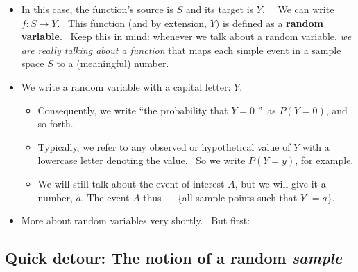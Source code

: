 \documentclass[11pt]{article}
\begin{document}
\begin{itemize}
\begin{itemize}
\item In this case, the function's source is $S$ and its target is $Y$. \ \
We can write $f:S\rightarrow Y.$ \ This function (and by extension, $Y)$ is
defined as a \textbf{random variable}. \ Keep this in mind: whenever we talk
about a random variable, \textit{we are really talking about a function}
that maps each simple event in a sample space $S$ to a (meaningful) number.

\item We write a random variable with a capital letter: $Y$.

\begin{itemize}
\item Consequently, we write \textquotedblleft the probability that $Y=0$%
\textquotedblright\ as $P(Y=0)$, and so forth. \ 

\item Typically, we refer to any observed or hypothetical value of $Y$ with
a lowercase letter denoting the value. \ So we write $P(Y=y)$, for example.

\item We will still talk about the event of interest $A$, but we will give
it a number, $a$. The event $A$ thus $\equiv $\{all sample points such that $%
Y$ $=a$\}.
\end{itemize}

\item More about random variables very shortly. \ But first:
\end{itemize}
\end{itemize}

\subsection{Quick detour: The notion of a random \textit{sample}}
\end{document}
